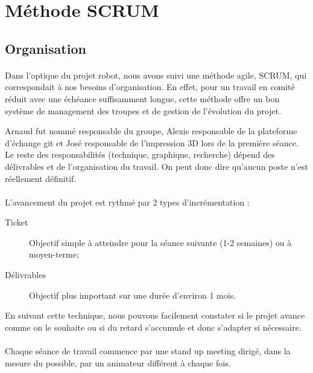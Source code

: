 

\section{Méthode SCRUM}
\subsection{Organisation}
\paragraph{}
Dans l'optique du projet robot, nous avons suivi une méthode agile, SCRUM, qui correspondait à nos besoins d'organisation. En effet, pour un travail en comité réduit avec une échéance suffisamment longue, cette méthode offre un bon système de management des troupes et de gestion de l'évolution du projet.

\noindent Arnaud fut nommé responsable du groupe, Alexis responsable de la plateforme d'échange git et José responsable de l'impression 3D lors de la première séance. Le reste des responsabilités (technique, graphique, recherche) dépend des délivrables et de l'organisation du travail. On peut donc dire qu'aucun poste n'est réellement définitif.

\paragraph{}
L'avancement du projet est rythmé par 2 types d'incrémentation : 
\begin{description}
	\item[Ticket] Objectif simple à atteindre pour la séance suivante (1-2 semaines) ou à moyen-terme;
	\item[Délivrables] Objectif plus important sur une durée d'environ 1 mois.
\end{description}

\noindent En suivant cette technique, nous pouvons facilement constater si le projet avance comme on le souhaite ou si du retard s'accumule et donc s'adapter si nécessaire.

\paragraph{}
Chaque séance de travail commence par une stand up meeting dirigé, dans la mesure du possible, par un animateur différent à chaque fois.

